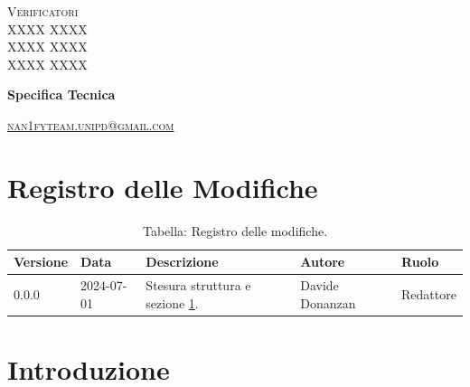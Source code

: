 \documentclass[8pt]{article}
\begin{document}
\begin{titlepage}
\begin{minipage}[t]{0.47\textwidth}
		{\large{\textsc{Verificatori}}
			\vspace{3mm}
			{\\\large{\textsc{XXXX XXXX}\\}} 
			{\large{\textsc{XXXX XXXX}\\}} 
			{\large{\textsc{XXXX XXXX}\\}}
			
		}
		\vspace{2mm}\vspace{2mm}
	\end{minipage}
	\vspace{4cm}
	\begin{center}
		\begin{flushright}
			{\fontsize{30pt}{52pt}\selectfont \textbf{Specifica Tecnica}} %
		\end{flushright}
		\vspace{3cm}
	\end{center}
	\vspace{10 cm}
	{\small \textsc{\href{mailto: nan1fyteam.unipd@gmail.com}{nan1fyteam.unipd@gmail.com}}}
\end{titlepage}
\pagestyle{mystyle}
\section*{Registro delle Modifiche}
\begin{table}[ht!]	
	\centering
	\begin{tabular}{p{1.2cm} p{2cm} p{6cm} p{3cm} p{2cm}}
		\toprule
		\textbf{Versione}& \textbf{Data} & \textbf{Descrizione} & \textbf{Autore} & \textbf{Ruolo} \\
		\midrule
		    0.0.0 & 2024-07-01 & Stesura struttura e sezione \ref{sec:intro}. & Davide Donanzan & Redattore \\
		\bottomrule
	\end{tabular}
	\caption*{Tabella: Registro delle modifiche.}
	\label{table:Registro delle modifiche}
\end{table}
\newpage
\tableofcontents
\newpage
\listoffigures
\newpage
\listoftables
\newpage
\justifying
\section{Introduzione}\label{sec:intro}
\end{document}

